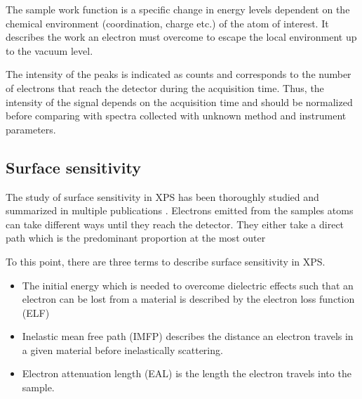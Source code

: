 The sample work function is a specific change in energy levels dependent on the chemical environment (coordination, charge etc.) of the atom of interest. It describes the work an electron must overcome to escape the local environment up to the vacuum level.

The intensity of the peaks is indicated as counts and corresponds to the number of electrons that reach the detector during the acquisition time. Thus, the intensity of the signal depends on the acquisition time and should be normalized before comparing with spectra collected with unknown method and instrument parameters. 



\subsection{Surface sensitivity}

The study of surface sensitivity in XPS has been thoroughly studied and summarized in multiple publications \cite{powell_surface_2009, }. Electrons emitted from the samples atoms can take different ways until they reach the detector. They either take a direct path which is the predominant proportion at the most outer 


To this point, there are three terms to describe surface sensitivity in XPS.
\begin{itemize}
\item The initial energy which is needed to overcome dielectric effects such that an electron can be lost from a material is described by the electron loss function (ELF)
\item Inelastic mean free path (IMFP) describes the distance an electron travels in a given material before inelastically scattering.
\item Electron attenuation length (EAL) is the length the electron travels into the sample.

\end{itemize}

